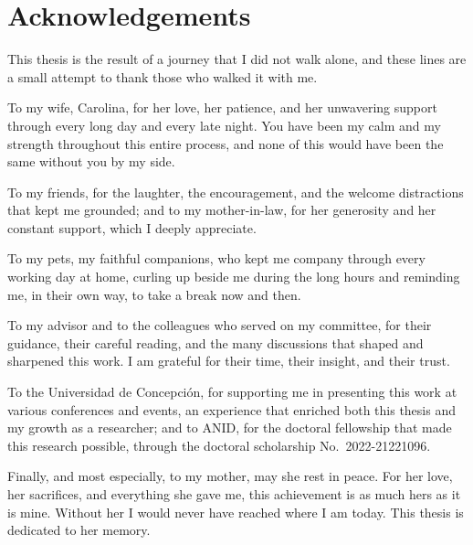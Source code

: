 \chapter*{Acknowledgements}

This thesis is the result of a journey that I did not walk alone, and these lines are a small attempt to thank those who walked it with me.

To my wife, Carolina, for her love, her patience, and her unwavering support through every long day and every late night. You have been my calm and my strength throughout this entire process, and none of this would have been the same without you by my side.

To my friends, for the laughter, the encouragement, and the welcome distractions that kept me grounded; and to my mother-in-law, for her generosity and her constant support, which I deeply appreciate.

To my pets, my faithful companions, who kept me company through every working day at home, curling up beside me during the long hours and reminding me, in their own way, to take a break now and then.

To my advisor and to the colleagues who served on my committee, for their guidance, their careful reading, and the many discussions that shaped and sharpened this work. I am grateful for their time, their insight, and their trust.

To the Universidad de Concepción, for supporting me in presenting this work at various conferences and events, an experience that enriched both this thesis and my growth as a researcher; and to ANID, for the doctoral fellowship that made this research possible, through the doctoral scholarship No.~2022-21221096.

Finally, and most especially, to my mother, may she rest in peace. For her love, her sacrifices, and everything she gave me, this achievement is as much hers as it is mine. Without her I would never have reached where I am today. This thesis is dedicated to her memory.
